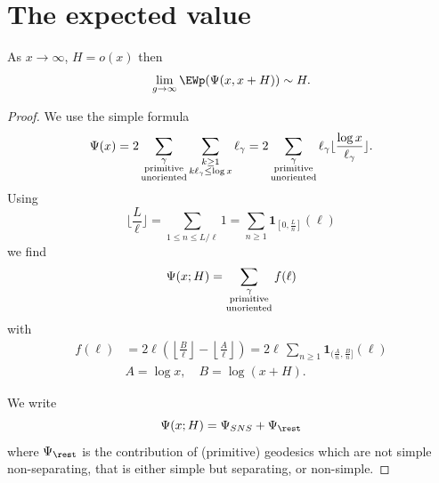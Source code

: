 \documentclass[12pt]{amsart}
\begin{document}
 

 

 \section{The expected value}\label{sec:expectation}


\begin{prop}\label{prop:expected value Psi}
As $x\to \infty$,  $H=o(x)$ then 
$$\lim_{g\to \infty} \EWp(\Psi(x,x+H))\sim H.$$ 
\end{prop}
  \begin{proof}

 

We use the simple formula
\[
\Psi(x) = 2\sum_{\substack{\gamma\\ {\rm primitive}\\ {\rm unoriented}}} \sum_{\substack{k\geq 1\\ k\ell_\gamma\leq \log x}} \ell_\gamma = 
 2\sum_{\substack{\gamma\\ {\rm primitive}\\ {\rm unoriented}}}
\ell_\gamma \lfloor \frac{\log x}{\ell_\gamma} \rfloor.
\] 
Using  
\[
\lfloor \frac L \ell \rfloor = \sum_{1\leq n\leq L/\ell} 1 = \sum_{n\geq 1} 
\mathbf 1_{[0,\frac Ln]}(\ell)
\]
we find 
\begin{equation}\label{eq:formula for psi(x;H)}
\Psi(x;H) =  \sum_{\substack{\gamma\\ {\rm primitive}\\ {\rm unoriented}}}
f(\ell) 
\end{equation}
with
\begin{equation}\label{definition of f}
\begin{split}
f(\ell) &= 2 \ell \left( \left \lfloor \frac {B}{\ell} \right\rfloor -  \left \lfloor \frac {A}{\ell} \right\rfloor  \right)
=2\ell \, \sum_{n\geq 1} \mathbf 1_{( \frac An, \frac Bn]}(\ell)
\\
&A=\log x, \quad B=\log(x+H) .
\end{split}
\end{equation}




We write 
\[
\Psi(x;H)= \Psi_{SNS} +  \Psi_{\rest}
\]
 where $\Psi_{\rest}$ is the contribution of (primitive) geodesics which are not simple non-separating, that is either simple but separating, or non-simple.


\end{proof}
\end{document}

